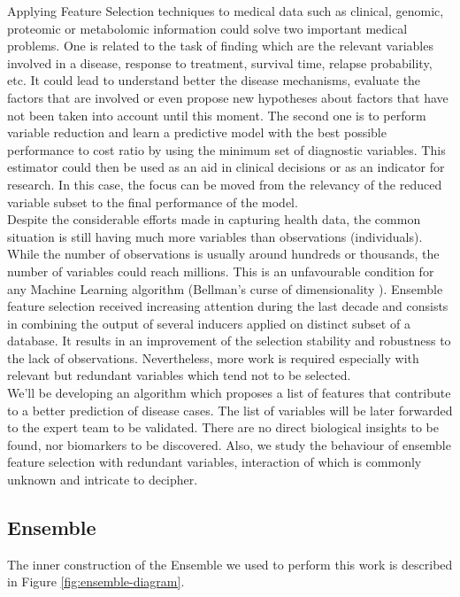Applying Feature Selection techniques to medical data such as clinical, genomic, proteomic or metabolomic information could solve two important medical problems. One is related to the task of finding which are the relevant variables involved in a disease, response to treatment, survival time, relapse probability, etc. It could lead to understand better the disease mechanisms, evaluate the factors that are involved or even propose new hypotheses about factors that have not been taken into account until this moment. The second one is to perform variable reduction and learn a predictive model with the best possible performance to cost ratio by using the minimum set of diagnostic variables. This estimator could then be used as an aid in clinical decisions or as an indicator for research. In this case, the focus can be moved from the relevancy of the reduced variable subset to the final performance of the model. 
\\

Despite the considerable efforts made in capturing health data, the common situation is still having much more variables than observations (individuals). While the number of observations is usually around hundreds or thousands, the number of variables could reach millions. This is an unfavourable condition for any Machine Learning algorithm (Bellman's curse of dimensionality \cite{Bellman2015AdaptiveTour}). Ensemble feature selection received increasing attention during the last decade \cite{Bolon-Canedo2019EnsemblesTrends} \cite{Pes2020EnsembleDomains} and consists in combining the output of several inducers applied on distinct subset of a database. It results in an improvement of the selection stability and robustness to the lack of observations. Nevertheless, more work is required especially with relevant but redundant variables which tend not to be selected. 
\\

We'll be developing an algorithm which proposes a list of features that contribute to a better prediction of disease cases. The list of variables will be later forwarded to the expert team to be validated. 
There are no direct biological insights to be found, nor biomarkers to be discovered. Also, we study the behaviour of ensemble feature selection with redundant variables, interaction of which is commonly unknown and intricate to decipher.
\\

\subsection{Ensemble}
The inner construction of the Ensemble we used to perform this work is described in Figure \ref{fig:ensemble-diagram}.
\\

